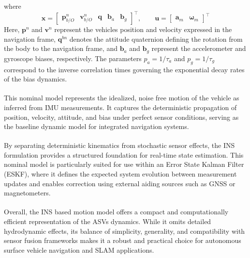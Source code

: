 where
$$
    \mathbf{x} =
    \begin{bmatrix}
        \mathbf{p}_{b/O}^{n} & \mathbf{v}_{b/O}^{n} & \mathbf{q} & \mathbf{b}_a & \mathbf{b}_g
    \end{bmatrix}^\top,
    \qquad
    \mathbf{u} =
    \begin{bmatrix}
        \mathbf{a}_m & \boldsymbol{\omega}_m
    \end{bmatrix}^\top
$$
Here, $\mathbf{p}^n$ and $\mathbf{v}^n$ represent the vehicles position and velocity expressed in the navigation frame, $\mathbf{q}^{bn}$ denotes the attitude quaternion defining the rotation from the body to the navigation frame, and $\mathbf{b}_a$ and $\mathbf{b}_g$ represent the accelerometer and gyroscope biases, respectively. The parameters $p_a = 1/\tau_a$ and $p_g = 1/\tau_g$ correspond to the inverse correlation times governing the exponential decay rates of the bias dynamics.  
\\ \\
This nominal model represents the idealized, noise free motion of the vehicle as inferred from IMU measurements. It captures the deterministic propagation of position, velocity, attitude, and bias under perfect sensor conditions, serving as the baseline dynamic model for integrated navigation systems.  
\\ \\
By separating deterministic kinematics from stochastic sensor effects, the INS formulation provides a structured foundation for real-time state estimation. This nominal model is particularly suited for use within an Error State Kalman Filter (ESKF), where it defines the expected system evolution between measurement updates and enables correction using external aiding sources such as GNSS or magnetometers.  
\\ \\
Overall, the INS based motion model offers a compact and computationally efficient representation of the ASVs dynamics. While it omits detailed hydrodynamic effects, its balance of simplicity, generality, and compatibility with sensor fusion frameworks makes it a robust and practical choice for autonomous surface vehicle navigation and SLAM applications.



